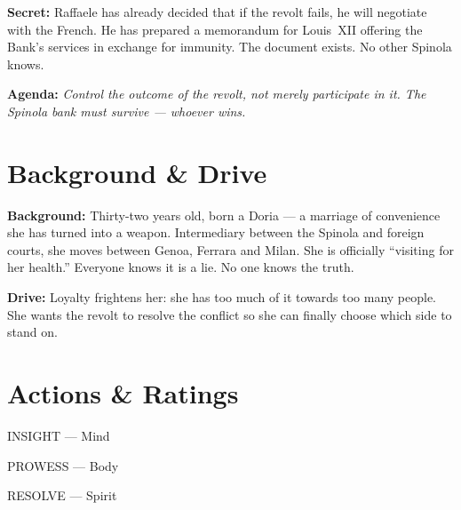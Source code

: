 \clearpage
\begin{secretbox}
\textbf{Secret:} Raffaele has already decided that if the revolt fails, he will
negotiate with the French. He has prepared a memorandum for Louis~XII offering the
Bank's services in exchange for immunity. The document exists. No other Spinola knows.

\medskip\noindent\textcolor{SecretRed}{\textbf{Agenda:}} \textit{Control the outcome
of the revolt, not merely participate in it. The Spinola bank must survive ---
whoever wins.}
\end{secretbox}

\clearpage


\section*{Background \& Drive}
\begin{rulebox}{}
\textbf{Background:} Thirty-two years old, born a Doria --- a marriage of convenience
she has turned into a weapon. Intermediary between the Spinola and foreign courts,
she moves between Genoa, Ferrara and Milan. She is officially ``visiting for her
health.'' Everyone knows it is a lie. No one knows the truth.

\medskip\noindent\textcolor{SpinolaRed}{\textbf{Drive:}} Loyalty frightens her: she
has too much of it towards too many people. She wants the revolt to resolve the
conflict so she can finally choose which side to stand on.
\end{rulebox}

\section*{Actions \& Ratings}
\begin{attributoblock}[SpinolaRed]{INSIGHT --- Mind}
\end{attributoblock}
\begin{attributoblock}[SpinolaRed]{PROWESS --- Body}
\end{attributoblock}
\begin{attributoblock}[SpinolaRed]{RESOLVE --- Spirit}
\end{attributoblock}

